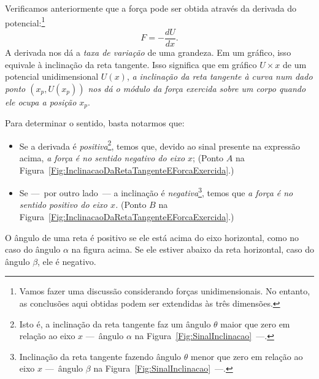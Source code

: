 Verificamos anteriormente que a força pode ser obtida através da derivada do potencial:\footnote{Vamos fazer uma discussão considerando forças unidimensionais. No entanto, as conclusões aqui obtidas podem ser extendidas às três dimensões.}
\begin{equation*}
    F = -\frac{dU}{dx}.
\end{equation*}
%
A derivada nos dá a \emph{taxa de variação} de uma grandeza. Em um gráfico, isso equivale à inclinação da reta tangente. Isso significa que em gráfico $U \times x$ de um potencial unidimensional $U(x)$, \emph{a inclinação da reta tangente à curva num dado ponto $(x_p, U(x_p))$ nos dá o módulo da força exercida sobre um corpo quando ele ocupa a posição $x_p$}.

Para determinar o sentido, basta notarmos que:
\begin{itemize}
    \item Se a derivada é \emph{positiva}\footnote[][-1cm]{Isto é, a inclinação da reta tangente faz um ângulo $\theta$ maior que zero em relação ao eixo $x$ ---~ângulo $\alpha$ na Figura~\ref{Fig:SinalInclinacao}~---.}, temos que, devido ao sinal presente na expressão acima, \emph{a força é no sentido negativo do eixo $x$}; (Ponto $A$ na Figura~\ref{Fig:InclinacaoDaRetaTangenteEForcaExercida}.)
    \item Se ---~por outro lado~--- a inclinação é \emph{negativa}\footnote[][-1.5cm]{Inclinação da reta tangente fazendo ângulo $\theta$ menor que zero em relação ao eixo $x$ ---~ângulo $\beta$ na Figura~\ref{Fig:SinalInclinacao}~---.}, temos que \emph{a força é no sentido positivo do eixo $x$.} (Ponto $B$ na Figura~\ref{Fig:InclinacaoDaRetaTangenteEForcaExercida}.)
\end{itemize}

\begin{marginfigure}
\caption{O ângulo de uma reta é positivo se ele está acima do eixo horizontal, como no caso do ângulo $\alpha$ na figura acima. Se ele estiver abaixo da reta horizontal, caso do ângulo $\beta$, ele é negativo. \label{Fig:SinalInclinacao}}
\end{marginfigure}

